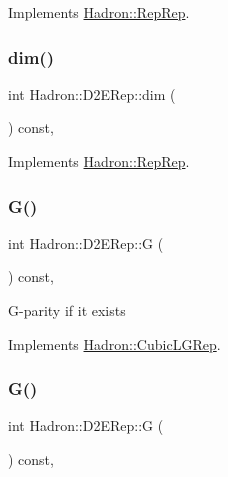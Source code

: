 Implements \mbox{\hyperlink{structHadron_1_1RepRep_a92c8802e5ed7afd7da43ccfd5b7cd92b}{Hadron\+::\+Rep\+Rep}}.

\mbox{\label{structHadron_1_1D2ERep_acf6c72a31e0813079ddaea61133600e4}} 
\subsubsection{\texorpdfstring{dim()}{dim()}\hspace{0.1cm}{\footnotesize\ttfamily [3/3]}}
{\footnotesize\ttfamily int Hadron\+::\+D2\+E\+Rep\+::dim (\begin{DoxyParamCaption}{ }\end{DoxyParamCaption}) const\hspace{0.3cm}{\ttfamily [inline]}, {\ttfamily [virtual]}}



Implements \mbox{\hyperlink{structHadron_1_1RepRep_a92c8802e5ed7afd7da43ccfd5b7cd92b}{Hadron\+::\+Rep\+Rep}}.

\mbox{\label{structHadron_1_1D2ERep_a5ba7e32b685da5cc0ba1e1bca3a930eb}} 
\subsubsection{\texorpdfstring{G()}{G()}\hspace{0.1cm}{\footnotesize\ttfamily [1/2]}}
{\footnotesize\ttfamily int Hadron\+::\+D2\+E\+Rep\+::G (\begin{DoxyParamCaption}{ }\end{DoxyParamCaption}) const\hspace{0.3cm}{\ttfamily [inline]}, {\ttfamily [virtual]}}

G-\/parity if it exists 

Implements \mbox{\hyperlink{structHadron_1_1CubicLGRep_ace26f7b2d55e3a668a14cb9026da5231}{Hadron\+::\+Cubic\+L\+G\+Rep}}.

\mbox{\label{structHadron_1_1D2ERep_a5ba7e32b685da5cc0ba1e1bca3a930eb}} 
\subsubsection{\texorpdfstring{G()}{G()}\hspace{0.1cm}{\footnotesize\ttfamily [2/2]}}
{\footnotesize\ttfamily int Hadron\+::\+D2\+E\+Rep\+::G (\begin{DoxyParamCaption}{ }\end{DoxyParamCaption}) const\hspace{0.3cm}{\ttfamily [inline]}, {\ttfamily [virtual]}}

